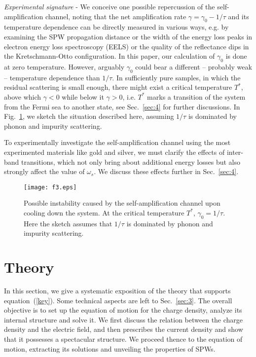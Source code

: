 \documentclass[aps,reprint]{revtex4-1}
\begin{document}
\textit{Experimental signature} - We conceive one possible repercussion of the self-amplification channel, noting that the net amplification rate $\gamma = \gamma_0-1/\tau$ and its temperature dependence can be directly measured in various ways, e.g. by examining the SPW propagation distance or the width of the energy loss peaks in electron energy loss spectroscopy (EELS) or the quality of the reflectance dips in the Kretschmann-Otto configuration. In this paper, our calculation of $\gamma_0$ is done at zero temperature. However, arguably $\gamma_0$ could bear a different -- probably weak -- temperature dependence than $1/\tau$. In sufficiently pure samples, in which the residual scattering is small enough, there might exist a critical temperature $T^*$, above which $\gamma<0$ while below it $\gamma>0$, i.e.  $T^*$ marks a transition of the system from the Fermi sea to another state, see Sec.~\ref{sec:4} for further discussions. In Fig.~\ref{figure:f3}, we sketch the situation described here, assuming $1/\tau$ is dominated by phonon and impurity scattering.  

To experimentally investigate the self-amplification channel using the most experimented materials like gold and silver, we must clarify the effects of inter-band transitions, which not only bring about additional energy losses but also strongly affect the value of $\omega_s$. We discuss these effects further in Sec.~\ref{sec:4}.

\begin{figure}
\begin{center}
\texttt{[image: f3.eps]}
\end{center}
\caption{Possible instability caused by the self-amplification channel upon cooling down the system. At the critical temperature $T^*$, $\gamma_0 = 1/\tau$. Here the sketch assumes that $1/\tau$ is dominated by phonon and impurity scattering. \label{figure:f3}}
\end{figure} 

\section{Theory}
\label{sec:theory}
In this section, we give a systematic exposition of the theory that supports equation~(\ref{key}). Some technical aspects are left to Sec.~\ref{sec:3}. The overall objective is to set up the equation of motion for the charge density, analyze its internal structure and solve it. We first discuss the relation between the charge density and the electric field, and then prescribes the current density and show that it possesses a spectacular structure. We proceed thence to the equation of motion, extracting its solutions and unveiling the properties of SPWs. 
\end{document}
